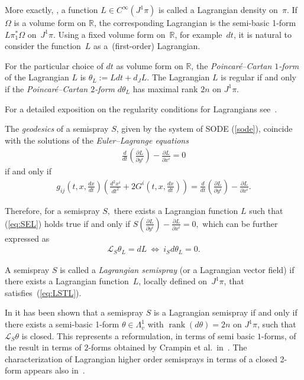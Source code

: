 \documentclass[pdftex]{sigma}
\begin{document}
\begin{remark}
More exactly, \cite{saunders89}, a function $L\in C^{\infty}(J^{1}\pi)$
is called a Lagrangian density on~$\pi$. If~$\Omega$ is a volume
form on $\mathbb{R}$, the corresponding Lagrangian is the semi-basic
1-form $L\pi_{1}^{*}\Omega$ on~$J^{1}\pi$. Using a f\/ixed volume form
on~$\mathbb{R}$, for example~$dt$, it is natural to consider the
function~$L$ as a~(f\/irst-order) Lagrangian.
\end{remark}

For the particular choice of $dt$ as volume form on $\mathbb{R}$,
the \emph{Poincar\'e--Cartan $1$-form} of the Lagrangian $L$ is
$\theta_{L}:=Ldt+d_{J}L$. The Lagrangian $L$ is regular if and only
if the \emph{Poincar\'e--Cartan $2$-form} $d\theta_{L}$ has maximal
rank $2n$ on $J^{1}\pi$.

For a detailed exposition on the regularity conditions for Lagrangians
see~\cite{Krupkova}.


The \emph{geodesics} of a semispray $S$, given by the system of SODE
(\ref{sode}), coincide with the solutions of the \emph{Euler--Lagrange
equations} \begin{gather*}
\frac{d}{dt}\left(\frac{\partial L}{\partial y^{i}}\right)-\frac{\partial L}{\partial x^{i}}=0%
\end{gather*}
 if and only if \begin{gather}
g_{ij}\left(t,x,\frac{dx}{dt}\right)\left(\frac{d^{2}x^{i}}{dt^{2}}+2G^{i}\left(t,x,\frac{dx}{dt}\right)\right)=\frac{d}{dt}\left(\frac{\partial L}{\partial y^{i}}\right)-\frac{\partial L}{\partial x^{i}}.\label{eq:SEL}\end{gather}


Therefore, for a semispray $S,$ there exists a Lagrangian function
$L$ such that (\ref{eq:SEL}) holds true if and only if $S\left(\frac{\partial L}{\partial y^{i}}\right)-\frac{\partial L}{\partial x^{i}}=0,$
which can be further expressed as
\begin{gather}
\mathcal{L}_{S}\theta_{L}=dL \ \Leftrightarrow \ i_{S}d\theta_{L}=0.\label{eq:LSTL}
\end{gather}


\begin{definition}
A semispray $S$ is called a \emph{Lagrangian semispray} (or a Lagrangian
vector f\/ield) if there exists a Lagrangian function~$L$,
locally def\/ined on~$J^{1}\pi$, that satisf\/ies~(\ref{eq:LSTL}).
\end{definition}

In \cite{B-C-2010} it has been shown that a semispray $S$ is a Lagrangian
semispray if and only if there exists a semi-basic 1-form $\theta\in\Lambda_{v}^{1}$
with $\operatorname{rank}(d\theta)=2n$ on $J^{1}\pi$, such that
$\mathcal{L}_{S}\theta$ is closed. This represents a reformulation,
in terms of semi basic $1$-forms, of the result in terms of $2$-forms
obtained by Crampin et al.\ in~\cite{crampin84a}. The characterization
of Lagrangian higher order semisprays in terms of a closed 2-form
appears also in~\cite{anderso92}.
\end{document}
